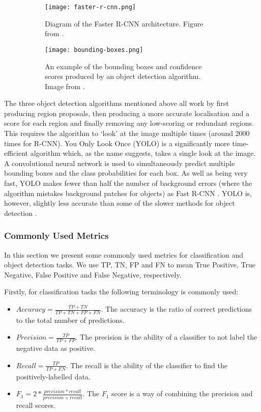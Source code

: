 \documentclass[../interim.tex]{subfiles}
\begin{document}
\begin{figure}
  \begin{subfigure}{0.4\textwidth}
    \centering
    \texttt{[image: faster-r-cnn.png]}
    \caption{Diagram of the Faster R-CNN architecture. Figure from \cite{cnn-uses:faster-r-cnn}.}
    \label{fig:fasterrcnn}
  \end{subfigure}
  \hfill
  \begin{subfigure}{0.55\textwidth}
    \centering
    \texttt{[image: bounding-boxes.png]}
    \caption{An example of the bounding boxes and confidence scores produced by an object detection algorithm. Image from \cite{obj-detection-examples}.}
    \label{fig:bounding-boxes}
  \end{subfigure}
  \caption{ }
\end{figure}

The three object detection algorithms mentioned above all work by first producing region proposals, then producing a more accurate localisation and a score for each region and finally removing any low-scoring or redundant regions. This requires the algorithm to `look' at the image multiple times (around 2000 times for R-CNN). You Only Look Once (YOLO) is a significantly more time-efficient algorithm which, as the name suggests, takes a single look at the image. A convolutional neural network is used to simultaneously predict multiple bounding boxes and the class probabilities for each box. As well as being very fast, YOLO makes fewer than half the number of background errors (where the algorithm mistakes background patches for objects) as Fast R-CNN \cite{yolo}. YOLO is, however, slightly less accurate than some of the slower methods for object detection \cite{cnn-uses:yolo-v3}.

\subsubsection{Commonly Used Metrics}

In this section we present some commonly used metrics for classification and object detection tasks. We use TP, TN, FP and FN to mean True Positive, True Negative, False Positive and False Negative, respectively.

Firstly, for classification tasks the following terminology is commonly used:
\begin{itemize}
  \item $Accuracy = \frac{TP + TN}{TP + TN + FP + FN}$. The accuracy is the ratio of correct predictions to the total number of predictions.

  \item $Precision = \frac{TP}{TP + FP}$. The precision is the ability of a classifier to not label the negative data as positive.

  \item $Recall = \frac{TP}{TP + FN}$. The recall is the ability of the classifier to find the positively-labelled data.

  \item $F_1 = 2 * \frac{precision * recall}{precision + recall}$. The $F_1$ score is a way of combining the precision and recall scores.
\end{itemize}
\end{document}
